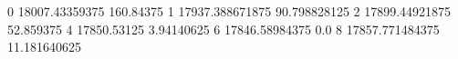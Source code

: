 0 18007.43359375 160.84375
1 17937.388671875 90.798828125
2 17899.44921875 52.859375
4 17850.53125 3.94140625
6 17846.58984375 0.0
8 17857.771484375 11.181640625
